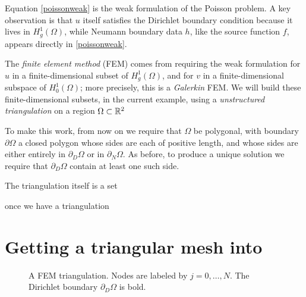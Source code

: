 Equation \eqref{poissonweak} is the weak formulation of the Poisson problem.  A key observation is that $u$ itself satisfies the Dirichlet boundary condition because it lives in $H_g^1(\Omega)$, while Neumann boundary data $h$, like the source function $f$, appears directly in \eqref{poissonweak}.

The \emph{finite element method} (FEM) comes from requiring the weak formulation for $u$ in a finite-dimensional subset of $H_g^1(\Omega)$, and for $v$ in a finite-dimensional subspace of $H_0^1(\Omega)$; more precisely, this is a \emph{Galerkin} FEM.  We will build these finite-dimensional subsets, in the current example, using a \emph{unstructured triangulation} on a region $\Omega\subset \mathbb{R}^2$

To make this work, from now on we require that $\Omega$ be polygonal,
 with boundary $\partial\Omega$ a closed polygon whose sides are each of positive length, and whose sides are either entirely in $\partial_D\Omega$ or in $\partial_N\Omega$.  As before, to produce a unique solution we require that $\partial_D\Omega$ contain at least one such side.

The triangulation itself is a set

once we have a triangulation




\section{Getting a triangular mesh into \PETSc}

\begin{figure*}

\caption{A FEM triangulation.  Nodes are labeled by $j=0,\dots,N$.  The Dirichlet boundary $\partial_D \Omega$ is bold.}
\label{fig:triangulation}
\end{figure*}

